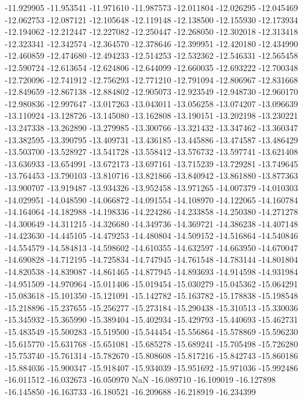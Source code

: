 -11.929905
-11.953541
-11.971610
-11.987573
-12.011804
-12.026295
-12.045469
-12.062753
-12.087121
-12.105648
-12.119148
-12.138500
-12.155930
-12.173934
-12.194062
-12.212447
-12.227082
-12.250447
-12.268050
-12.302018
-12.313418
-12.323341
-12.342574
-12.364570
-12.378646
-12.399951
-12.420180
-12.434990
-12.460859
-12.474680
-12.494233
-12.514253
-12.532362
-12.546331
-12.565458
-12.590724
-12.613654
-12.624806
-12.644099
-12.660035
-12.693222
-12.700348
-12.720096
-12.741912
-12.756293
-12.771210
-12.791094
-12.806967
-12.831668
-12.849659
-12.867138
-12.884802
-12.905073
-12.923549
-12.948730
-12.960170
-12.980836
-12.997647
-13.017263
-13.043011
-13.056258
-13.074207
-13.096639
-13.110924
-13.128726
-13.145080
-13.162808
-13.190151
-13.202198
-13.230221
-13.247338
-13.262890
-13.279985
-13.300766
-13.321432
-13.347462
-13.360347
-13.382595
-13.390795
-13.409731
-13.436185
-13.445886
-13.474587
-13.486429
-13.503700
-13.528927
-13.541728
-13.558412
-13.576732
-13.597741
-13.621408
-13.636933
-13.654991
-13.672173
-13.697161
-13.715239
-13.729281
-13.749645
-13.764453
-13.790103
-13.810716
-13.821866
-13.840942
-13.861880
-13.877363
-13.900707
-13.919487
-13.934326
-13.952458
-13.971265
-14.007379
-14.010303
-14.029951
-14.048590
-14.066872
-14.091554
-14.108970
-14.122065
-14.160784
-14.164064
-14.182988
-14.198336
-14.224286
-14.233858
-14.250380
-14.271278
-14.300649
-14.311215
-14.326680
-14.349736
-14.369721
-14.386238
-14.407148
-14.423630
-14.445105
-14.479253
-14.480804
-14.509152
-14.516864
-14.540846
-14.554579
-14.584813
-14.598602
-14.610355
-14.632597
-14.663950
-14.670047
-14.690828
-14.712195
-14.725834
-14.747945
-14.761548
-14.783144
-14.801804
-14.820538
-14.839087
-14.861465
-14.877945
-14.893693
-14.914598
-14.931984
-14.951509
-14.970964
-15.011406
-15.019454
-15.030279
-15.045362
-15.064291
-15.083618
-15.101350
-15.121091
-15.142782
-15.163782
-15.178838
-15.198548
-15.218896
-15.237655
-15.256277
-15.273184
-15.290438
-15.310513
-15.330036
-15.345932
-15.365990
-15.389404
-15.402934
-15.429793
-15.440693
-15.462731
-15.483549
-15.500283
-15.519500
-15.544454
-15.556864
-15.578869
-15.596230
-15.615770
-15.631768
-15.651081
-15.685278
-15.689241
-15.705498
-15.726280
-15.753740
-15.761314
-15.782670
-15.808608
-15.817216
-15.842743
-15.860186
-15.884036
-15.900347
-15.918407
-15.934039
-15.951692
-15.971036
-15.992486
-16.011512
-16.032673
-16.050970
NaN
-16.089710
-16.109019
-16.127898
-16.145850
-16.163733
-16.180521
-16.209688
-16.218919
-16.234399
